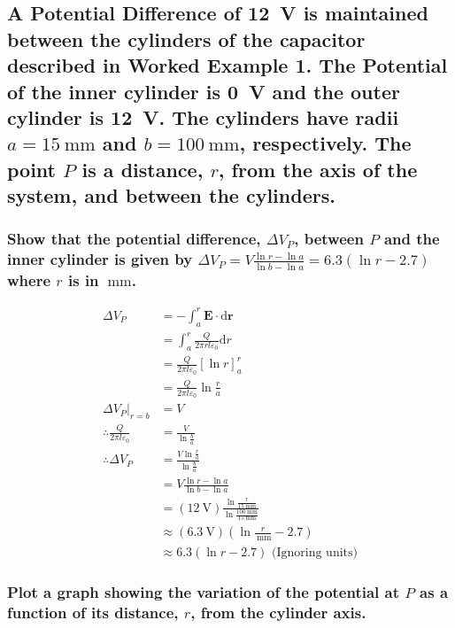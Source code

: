 \documentclass[a4paper]{scrartcl}
\begin{document}
\subsection{A Potential Difference of \SI{12}{\volt} is maintained between the cylinders of the capacitor described in Worked Example 1. The Potential of the inner cylinder is \SI{0}{\volt} and the outer cylinder is \SI{12}{\volt}. The cylinders have radii \(a = \SI{15}{\milli\metre}\) and \(b = \SI{100}{\milli\metre}\), respectively. The point \(P\) is a distance, \(r\), from the axis of the system, and between the cylinders.}
\subsubsection{Show that the potential difference, \(\Delta V_P\), between \(P\) and the inner cylinder is given by \(\Delta V_P = V \frac{\ln{r} - \ln{a}}{\ln{b} - \ln{a}} = 6.3 (\ln{r} - 2.7)\) where \(r\) is in \(\SI{}{\milli\metre}\).}
\begin{align*}
    \Delta V_P &= -\int_a^r \mathbf{E} \cdot \mathrm{d}\mathbf{r} \\
    &= \int_a^r \frac{Q}{2 \pi r l \varepsilon_0} \mathrm{d}r \\
    &= \frac{Q}{2 \pi l \varepsilon_0} \left[ \ln{r} \right]_a^r \\
    &= \frac{Q}{2 \pi l \varepsilon_0} \ln{\frac{r}{a}} \\
    \Delta V_P \bigg|_{r = b} &= V \\
    \therefore \frac{Q}{2 \pi l \varepsilon_0} &= \frac{V}{\ln{\frac{b}{a}}} \\
    \therefore \Delta V_P &= \frac{V \ln{\frac{r}{a}}}{\ln{\frac{b}{a}}} \\
    &= V \frac{\ln{r} - \ln{a}}{\ln{b} - \ln{a}} \\
    &= (\SI{12}{\volt})\frac{\ln{\frac{r}{\SI{15}{\milli\metre}}}}{\ln{\frac{\SI{100}{\milli\metre}}{\SI{15}{\milli\metre}}}} \\
    &\approx (\SI{6.3}{\volt}) (\ln{\frac{r}{\SI{}{\milli\metre}}} - 2.7) \\
    &\approx 6.3 (\ln{r} - 2.7) \text{ (Ignoring units)}
\end{align*}

\subsubsection{Plot a graph showing the variation of the potential at \(P\) as a function of its distance, \(r\), from the cylinder axis.}
\begin{center}
\end{center}
\end{document}
